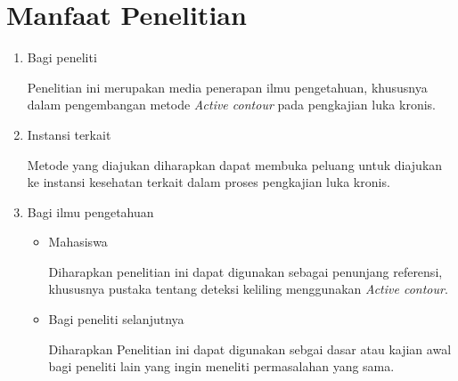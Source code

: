 \section{Manfaat Penelitian}
\begin{enumerate}
	\item Bagi peneliti
		
	Penelitian ini merupakan media penerapan ilmu pengetahuan, khususnya dalam pengembangan metode \emph{Active contour} pada pengkajian luka kronis.
		
	\item Instansi terkait 
	 	
	 	Metode yang diajukan diharapkan dapat membuka peluang untuk diajukan ke instansi kesehatan terkait dalam proses pengkajian luka kronis.	
	 	
	 \item Bagi ilmu pengetahuan
	 	\begin{itemize}
	 		\item Mahasiswa
	 			
	 			Diharapkan penelitian ini dapat digunakan sebagai penunjang referensi, khususnya pustaka tentang deteksi keliling menggunakan \emph{Active contour}.
	 			
	 		\item Bagi peneliti selanjutnya
	 			
	 			Diharapkan Penelitian ini dapat digunakan sebgai dasar atau kajian awal bagi peneliti lain yang ingin meneliti permasalahan yang sama.
	 			
	 	\end{itemize}	
\end{enumerate}


\begin{comment}

\end{comment}
